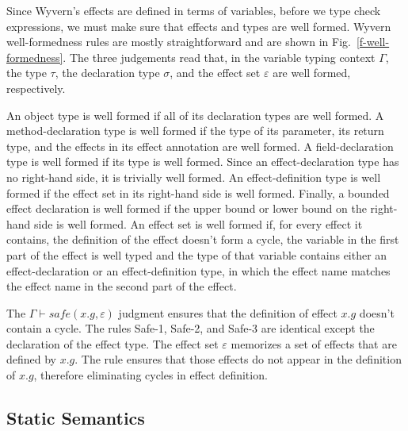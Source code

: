 Since Wyvern's effects are defined in terms of variables, before we type check expressions, we must make sure that effects and types are well formed. Wyvern well-formedness rules are mostly straightforward and are shown in Fig.~\ref{f-well-formedness}. The three judgements read that, in the variable typing context $\Gamma$, the type $\tau$, the declaration type $\sigma$, and the effect set $\varepsilon$ are well formed, respectively.

An object type is well formed if all of its declaration types are well formed. A method-declaration type is well formed if the type of its parameter, its return type, and the effects in its effect annotation are well formed. A field-declaration type is well formed if its type is well formed. Since an effect-declaration type has no right-hand side, it is trivially well formed. An effect-definition type is well formed if the effect set in its right-hand side is well formed. Finally, a bounded effect declaration is well formed if the upper bound or lower bound on the right-hand side is well formed. An effect set is well formed if, for every effect it contains, the definition of the effect doesn't form a cycle, the variable in the first part of the effect is well typed and the type of that variable contains either an effect-declaration or an effect-definition type, in which the effect name matches the effect name in the second part of the effect.

The $\Gamma \vdash safe(x.g, \varepsilon)$ judgment ensures that the definition of effect $x.g$ doesn't contain a cycle. The rules Safe-1, Safe-2, and Safe-3 are identical except the declaration of the effect type. The effect set $\varepsilon$ memorizes a set of effects that are defined by $x.g$. The rule ensures that those effects do not appear in the definition of $x.g$, therefore eliminating cycles in effect definition.



\subsection{Static Semantics}
\label{sec-static-semantics}

